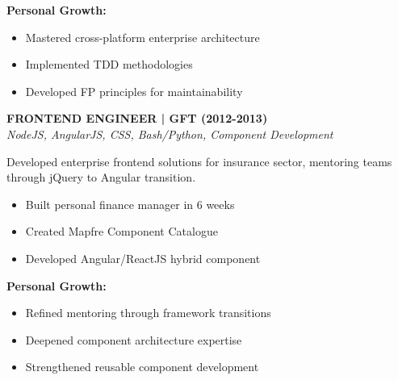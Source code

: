 \documentclass[a4paper,10pt]{article}
\begin{document}
\begin{minipage}{\textwidth}
	\vspace{0.2cm}
	\textbf{Personal Growth:}
	\vspace{0.2cm}
	\begin{itemize}[label=\textcolor{darkblue}{\textbullet}, leftmargin=*, nosep]
		\item Mastered cross-platform enterprise architecture
		\item Implemented TDD methodologies
		\item Developed FP principles for maintainability
	\end{itemize}

	\vspace{0.4cm}

	\noindent\textbf{FRONTEND ENGINEER | GFT (2012-2013)} \\
	\vspace{0.1cm}
	{\small\textit{NodeJS, AngularJS, CSS, Bash/Python, Component Development}}
	\vspace{0.2cm}

	Developed enterprise frontend solutions for insurance sector, mentoring teams through jQuery to Angular transition.

	\vspace{0.2cm}
	\begin{itemize}[label=\textcolor{darkblue}{\textbullet}, leftmargin=*, nosep]
		\item Built personal finance manager in 6 weeks
		\item Created Mapfre Component Catalogue
		\item Developed Angular/ReactJS hybrid component
	\end{itemize}

	\vspace{0.2cm}
	\textbf{Personal Growth:}
	\vspace{0.2cm}
	\begin{itemize}[label=\textcolor{darkblue}{\textbullet}, leftmargin=*, nosep]
		\item Refined mentoring through framework transitions
		\item Deepened component architecture expertise
		\item Strengthened reusable component development
	\end{itemize}
\end{minipage}
\end{document}

